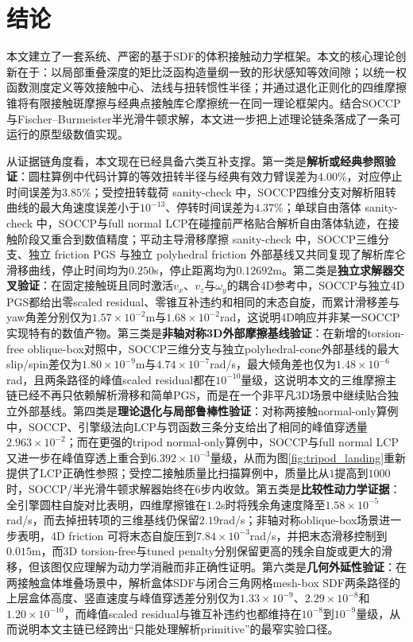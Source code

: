﻿\documentclass[12pt, a4paper]{ctexart}
\theoremstyle{plain}
\theoremstyle{remark}
\begin{document}
\section{结论}
本文建立了一套系统、严密的基于SDF的体积接触动力学框架。本文的核心理论创新在于：以局部重叠深度的矩比泛函构造量纲一致的形状感知等效间隙；以统一权函数测度定义等效接触中心、法线与扭转惯性半径；并通过退化正则化的四维摩擦锥将有限接触斑摩擦与经典点接触库仑摩擦统一在同一理论框架内。结合SOCCP与Fischer--Burmeister半光滑牛顿求解，本文进一步把上述理论链条落成了一条可运行的原型级数值实现。

从证据链角度看，本文现在已经具备六类互补支撑。第一类是\textbf{解析或经典参照验证}：圆柱算例中代码计算的等效扭转半径与经典有效力臂误差为$4.00\%$，对应停止时间误差为$3.85\%$；受控扭转载荷 sanity-check 中，SOCCP四维分支对解析阻转曲线的最大角速度误差小于$10^{-13}$、停转时间误差为$4.37\%$；单球自由落体 sanity-check 中，SOCCP与full normal LCP在碰撞前严格贴合解析自由落体轨迹，在接触阶段又重合到数值精度；平动主导滑移摩擦 sanity-check 中，SOCCP三维分支、独立 friction PGS 与独立 polyhedral friction 外部基线又共同复现了解析库仑滑移曲线，停止时间均为$0.250$s，停止距离均为$0.12692$m。第二类是\textbf{独立求解器交叉验证}：在固定接触斑且同时激活$v_x$、$v_z$与$\omega_y$的耦合4D参考中，SOCCP与独立4D PGS都给出零scaled residual、零锥互补违约和相同的末态自旋，而累计滑移差与yaw角差分别仅为$1.57\times10^{-2}$m与$1.68\times10^{-2}$rad，这说明4D响应并非某一SOCCP实现特有的数值产物。第三类是\textbf{非轴对称3D外部摩擦基线验证}：在新增的torsion-free oblique-box对照中，SOCCP三维分支与独立polyhedral-cone外部基线的最大slip/spin差仅为$1.80\times10^{-9}$m与$4.74\times10^{-7}$rad/s，最大倾角差也仅为$1.48\times10^{-6}$rad，且两条路径的峰值scaled residual都在$10^{-10}$量级，这说明本文的三维摩擦主链已经不再只依赖解析滑移和简单PGS，而是在一个非平凡3D场景中继续贴合独立外部基线。第四类是\textbf{理论退化与局部鲁棒性验证}：对称两接触normal-only算例中，SOCCP、引擎级法向LCP与罚函数三条分支给出了相同的峰值穿透量$2.963\times10^{-2}$；而在更强的tripod normal-only算例中，SOCCP与full normal LCP又进一步在峰值穿透上重合到$6.392\times10^{-3}$量级，从而为图\ref{fig:tripod_landing}重新提供了LCP正确性参照；受控二接触质量比扫描算例中，质量比从$1$提高到$1000$时，SOCCP/半光滑牛顿求解器始终在$6$步内收敛。第五类是\textbf{比较性动力学证据}：全引擎圆柱自旋对比表明，四维摩擦锥在$1.2$s时将残余角速度降至$1.58\times10^{-5}$rad/s，而去掉扭转项的三维基线仍保留$2.19$rad/s；非轴对称oblique-box场景进一步表明，4D friction 可将末态自旋压到$7.84\times10^{-3}$rad/s，并把末态滑移控制到$0.015$m，而3D torsion-free与tuned penalty分别保留更高的残余自旋或更大的滑移，但该图仅应理解为动力学消融而非正确性证明。第六类是\textbf{几何外延性验证}：在两接触盒体堆叠场景中，解析盒体SDF与闭合三角网格mesh-box SDF两条路径的上层盒体高度、竖直速度与峰值穿透差分别仅为$1.33\times10^{-9}$、$2.29\times10^{-8}$和$1.20\times10^{-10}$，而峰值scaled residual与锥互补违约也都维持在$10^{-8}$到$10^{-9}$量级，从而说明本文主链已经跨出``只能处理解析primitive''的最窄实验口径。
\end{document}
